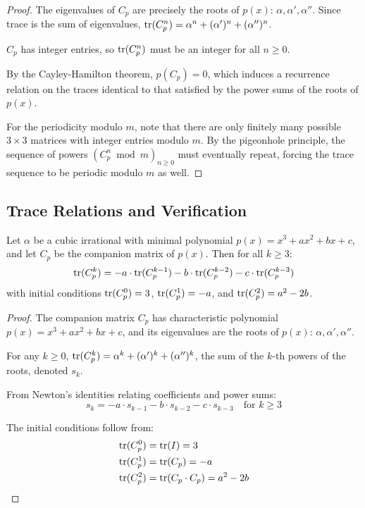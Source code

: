 \begin{proof}
The eigenvalues of $C_p$ are precisely the roots of $p(x)$: $\alpha, \alpha', \alpha''$. Since trace is the sum of eigenvalues, $\operatorname{tr}(C_p^n) = \alpha^n + (\alpha')^n + (\alpha'')^n$.

$C_p$ has integer entries, so $\operatorname{tr}(C_p^n)$ must be an integer for all $n \geq 0$.

By the Cayley-Hamilton theorem, $p(C_p) = 0$, which induces a recurrence relation on the traces identical to that satisfied by the power sums of the roots of $p(x)$.

For the periodicity modulo $m$, note that there are only finitely many possible $3 \times 3$ matrices with integer entries modulo $m$. By the pigeonhole principle, the sequence of powers $(C_p^n \bmod m)_{n \geq 0}$ must eventually repeat, forcing the trace sequence to be periodic modulo $m$ as well.
\end{proof}

\subsection{Trace Relations and Verification}

\begin{theorem}\label{thm:trace_relations}
Let $\alpha$ be a cubic irrational with minimal polynomial $p(x) = x^3 + ax^2 + bx + c$, and let $C_p$ be the companion matrix of $p(x)$. Then for all $k \geq 3$:
\begin{equation}
\operatorname{tr}(C_p^k) = -a \cdot \operatorname{tr}(C_p^{k-1}) - b \cdot \operatorname{tr}(C_p^{k-2}) - c \cdot \operatorname{tr}(C_p^{k-3})
\end{equation}
with initial conditions $\operatorname{tr}(C_p^0) = 3$, $\operatorname{tr}(C_p^1) = -a$, and $\operatorname{tr}(C_p^2) = a^2-2b$.
\end{theorem}

\begin{proof}
The companion matrix $C_p$ has characteristic polynomial $p(x) = x^3 + ax^2 + bx + c$, and its eigenvalues are the roots of $p(x)$: $\alpha, \alpha', \alpha''$.

For any $k \geq 0$, $\operatorname{tr}(C_p^k) = \alpha^k + (\alpha')^k + (\alpha'')^k$, the sum of the $k$-th powers of the roots, denoted $s_k$.

From Newton's identities relating coefficients and power sums:
\begin{equation}
s_k = -a \cdot s_{k-1} - b \cdot s_{k-2} - c \cdot s_{k-3} \quad \text{for } k \geq 3
\end{equation}

The initial conditions follow from:
\begin{align}
\operatorname{tr}(C_p^0) &= \operatorname{tr}(I) = 3 \\
\operatorname{tr}(C_p^1) &= \operatorname{tr}(C_p) = -a \\
\operatorname{tr}(C_p^2) &= \operatorname{tr}(C_p \cdot C_p) = a^2-2b
\end{align}
\end{proof}


